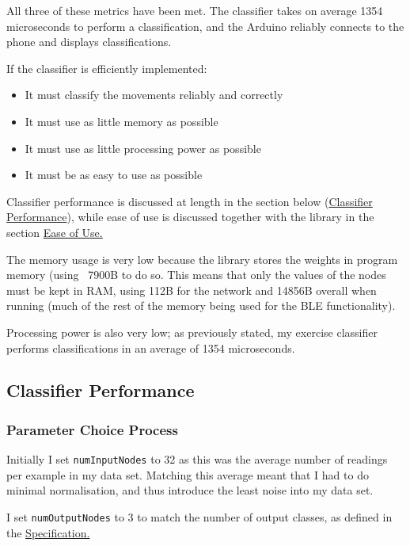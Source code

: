 \documentclass[a4paper]{article}
\begin{document}
All three of these metrics have been met. The classifier takes on average 1354 microseconds\cite{dsref0} to perform a classification, and the Arduino reliably connects to the phone and displays classifications.

If the classifier is efficiently implemented:

\begin{itemize}
\item It must classify the movements reliably and correctly
\item It must use as little memory as possible
\item It must use as little processing power as possible
\item It must be as easy to use as possible
\end{itemize}

Classifier performance is discussed at length in the section below (\hyperref[subsec:ev_cp]{Classifier Performance}), while ease of use is discussed together with the library in the section \hyperref[subsec:ev_eu]{Ease of Use.}

The memory usage is very low because the library stores the weights in program memory (using ~7900B to do so\cite{dsref2}. This means that only the values of the nodes must be kept in RAM, using 112B for the network and 14856B overall when running (much of the rest of the memory being used for the BLE functionality).

Processing power is also very low; as previously stated, my exercise classifier performs classifications in an average of 1354 microseconds\cite{dsref0}.

\subsection{Classifier Performance}%
\label{subsec:ev_cp}

\subsubsection{Parameter Choice Process}%
\label{subsubsec:ev_cp_parameterchoiceprocess}

Initially I set \lstinline{numInputNodes} to 32 as this was the average number of readings per example in my data set. Matching this average meant that I had to do minimal normalisation, and thus introduce the least noise into my data set.

I set \lstinline{numOutputNodes} to 3 to match the number of output classes, as defined in the \hyperref[subsubsec:dc_dc_classes]{Specification.}
\end{document}
